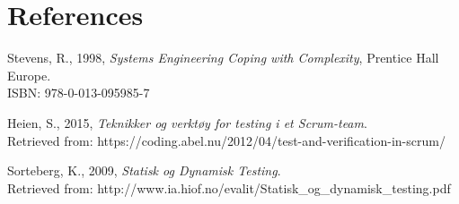 \section{References}
\begin{thebibliography}{10}
    Stevens, R., 1998, \textit{Systems Engineering Coping with Complexity}, Prentice Hall Europe. \\
    \qquad ISBN: 978-0-013-095985-7
    
    Heien, S., 2015, \textit{Teknikker og verktøy for testing i et Scrum-team}. \\
    \qquad Retrieved from: https://coding.abel.nu/2012/04/test-and-verification-in-scrum/
    
    Sorteberg, K., 2009, \textit{Statisk og Dynamisk Testing}. \\
    \qquad Retrieved from: http://www.ia.hiof.no/evalit/Statisk_og_dynamisk_testing.pdf
     
\end{thebibliography}
    
    
    



